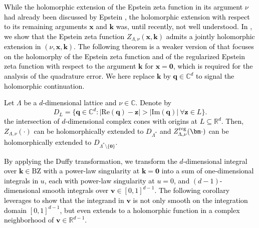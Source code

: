 \documentclass[]{amsart}
\numberwithin{mythm}{section}
\renewcommand{\Re}[1]{\mathrm{Re}(#1)}
\renewcommand{\Im}[1]{\mathrm{Im}(#1)}
\newcommand{\new}[1]{{\textcolor{black}{#1}}}
\begin{document}
\new{While the holomorphic extension of the Epstein zeta function in its argument $\nu$ had already been discussed by Epstein \cite{epstein1903theorieI,epstein1903theorieII}, the holomorphic extension with respect to its remaining arguments $\bm x$ and $\bm k$ was, until recently, not well understood.
In \cite{buchheit2024epstein}, we show that the Epstein zeta function $Z_{\Lambda,\nu}(\bm x,\bm k)$  admits a jointly holomorphic extension in $(\nu,\bm x,\bm k)$. The following theorem is a weaker version of \cite[Th.~2.13, Th.~2.16]{buchheit2024epstein} that focuses on the holomorphy of the Epstein zeta function and of the regularized Epstein zeta function with respect to the argument $\bm k$ for $\bm x=\bm 0$, which is required for the analysis of the quadrature error. We here replace $\bm k$ by $\bm q \in \mathds C^d$ to signal the holomorphic continuation.
}

\new{
\begin{theorem}
\label{holreg}
Let $\Lambda$ be a $d$-dimensional lattice and $\nu\in\mathds C$. 
Denote by 
$$
D_L=\{\bm q\in\mathds C^d:|\Re{\bm q}-\bm z|>|\Im{\bm q}|\ \forall \bm z\in L\}.
$$
the intersection of $d$-dimensional complex cones with origins at $L\subseteq \mathds R^d$.
Then, $Z_{\Lambda,\nu}(\bm \cdot)$ can be holomorphically extended to $D_{\Lambda^\ast}$
and $Z^{\rm reg}_{\Lambda,\nu}(\bm \cdot)$ 
can be holomorphically extended to 
$D_{\Lambda^*\setminus\{\bm 0\}}$.
\end{theorem}
}
\new{
By applying the Duffy transformation, we transform the $d$-dimensional integral over $\bm k\in \mathrm{BZ}$ with a power-law singularity at $\bm k=\bm 0$ into a sum of one-dimensional integrals in $u$, each with power-law singularity at $u=0$, and $(d-1)$-dimensional smooth integrals over $\bm v\in [0,1]^{d-1}$.
The following corollary leverages \Cref{holreg} to show that the integrand in $\bm v$ is not only smooth on the integration domain $[0,1]^{d-1}$, but even extends to a holomorphic function in a complex neighborhood of $\bm v \in \mathds R^{d-1}$.
}
\end{document}

